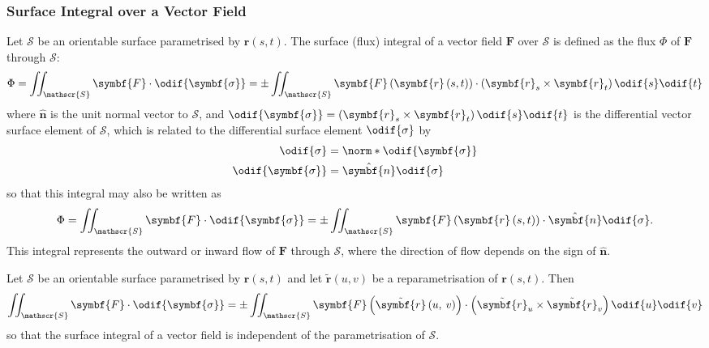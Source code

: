 \documentclass{article}
\begin{document}
\subsubsection{Surface Integral over a Vector Field}
Let \(\mathscr{S}\) be an orientable surface parametrised by
\(\symbf{r}\left( s, t \right)\). The surface (flux) integral of a
vector field \(\symbf{F}\) over \(\mathscr{S}\) is defined as the flux
\(\Phi\) of \(\symbf{F}\) through \(\mathscr{S}\):
\begin{equation*}
    \Phi =
    \iint_{\mathscr{S}} \symbf{F} \cdot \odif{\symbf{\sigma}} =
    \pm \iint_{\mathscr{S}} \symbf{F}\left( \symbf{r}\left( s, t \right) \right) \cdot \left( \symbf{r}_s \times \symbf{r}_t \right) \odif{s} \odif{t}
\end{equation*}
where \(\hat{\symbf{n}}\) is the unit normal vector to \(\mathscr{S}\),
and \(\odif{\symbf{\sigma}} = \left( \symbf{r}_s \times \symbf{r}_t \right) \odif{s}\odif{t}\)
is the differential vector surface element of \(\mathscr{S}\), which is
related to the differential surface element \(\odif{\sigma}\) by
\begin{align*}
    \odif{\sigma}         & = \norm*{\odif{\symbf{\sigma}}} \\
    \odif{\symbf{\sigma}} & = \hat{\symbf{n}} \odif{\sigma}
\end{align*}
so that this integral may also be written as
\begin{equation*}
    \Phi =
    \iint_{\mathscr{S}} \symbf{F} \cdot \odif{\symbf{\sigma}} =
    \pm \iint_{\mathscr{S}} \symbf{F}\left( \symbf{r}\left( s, t \right) \right) \cdot \hat{\symbf{n}} \odif{\sigma}.
\end{equation*}
This integral represents the outward or inward flow of \(\symbf{F}\)
through \(\mathscr{S}\), where the direction of flow depends on the sign
of \(\hat{\symbf{n}}\).
\begin{lemma}
    Let \(\mathscr{S}\) be an orientable surface parametrised by \(\symbf{r}\left( s, t \right)\)
    and let \(\tilde{\symbf{r}}\left( u, v \right)\) be a reparametrisation
    of \(\symbf{r}\left( s, t \right)\). Then
    \begin{equation*}
        \iint_{\mathscr{S}} \symbf{F} \cdot \odif{\symbf{\sigma}} = \pm \iint_{\mathscr{S}} \symbf{F}\left( \tilde{\symbf{r}}\left( u,\: v \right) \right) \cdot \left( \tilde{\symbf{r}}_u \times \tilde{\symbf{r}}_v \right) \odif{u} \odif{v}
    \end{equation*}
    so that the surface integral of a vector field is independent of the
    parametrisation of \(\mathscr{S}\).
\end{lemma}
\end{document}
